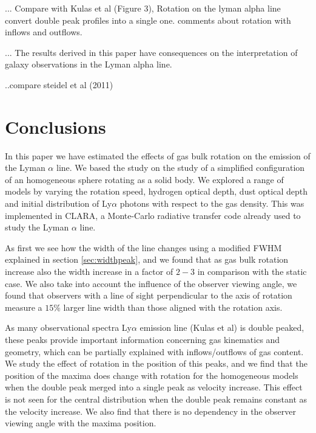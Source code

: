 \documentclass[usenatbib]{mn2e}
\begin{document}
... Compare with Kulas et al (Figure 3), Rotation on the lyman alpha
line convert double peak profiles into a single one. comments about
rotation with inflows and outflows.   

... The results derived in this paper have consequences on the
interpretation of galaxy observations in the Lyman alpha line.

..compare steidel et al (2011) 





\section{Conclusions}
In this paper we have estimated the effects of gas bulk rotation on
the emission  of the Lyman $\alpha$ line. We based the study on the
study of a simplified configuration of an homogeneous sphere rotating
as a solid body. We explored  a range of models by varying the
rotation speed, hydrogen optical depth, dust optical depth and initial
distribution of Ly$\alpha$ photons with respect to the gas
density. This was implemented in CLARA, a Monte-Carlo
radiative transfer code already used to study the Lyman $\alpha$
line. 

As first we see how the width of the line changes using a modified FWHM
explained in section \ref{sec:widthpeak}, and we found that as gas bulk 
rotation increase also the width increase in a factor of $2-3$ in comparison 
with the static case. We also take into account the influence of the observer 
viewing angle, we found that observers with a line of sight perpendicular  
to the axis of rotation measure a $15\%$ larger line width than those 
aligned with the rotation axis.

As many observational spectra Ly$\alpha$ emission line (Kulas et al)
is double  peaked, these peaks provide important information
concerning gas kinematics and geometry,  which can be partially
explained with inflows/outflows of gas content.  We study the effect
of rotation in the position of this peaks, and we find  that the
position of the maxima does change with rotation for the homogeneous
models when the double peak merged into a single peak as velocity
increase. This effect is not seen for the central distribution when
the double peak  remains constant as the velocity increase. We also
find that there is no dependency in the observer viewing angle with
the maxima position. 
\end{document}
